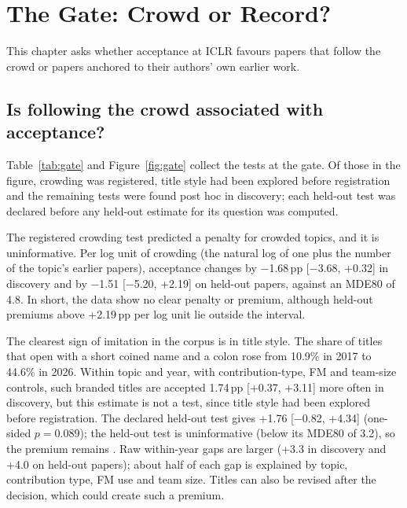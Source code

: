 \chapter{The Gate: Crowd or Record?}
\label{sec:gate}

This chapter asks whether acceptance at ICLR favours papers that follow the crowd or papers anchored to their authors'
own earlier work.

\section{Is following the crowd associated with acceptance?}
Table~\ref{tab:gate} and Figure~\ref{fig:gate} collect the tests at the gate. Of those in the figure, crowding was
registered, title style had been explored before registration and the remaining tests were found post hoc in
discovery; each held-out test was declared before any held-out estimate for its question was computed.

The registered crowding test predicted a penalty for crowded topics, and it is uninformative. Per log unit of crowding
(the natural log of one plus the number of the topic's earlier papers), acceptance changes by $-$1.68\,pp [$-$3.68,
+0.32] in discovery and by $-$1.51 [$-$5.20, +2.19] on held-out papers, against an MDE80 of 4.8. In short, the data show no clear penalty or premium, although held-out premiums above +2.19\,pp per log unit lie outside the interval.

The clearest sign of imitation in the corpus is in title style. The share of titles that open with a short coined
name and a colon rose from 10.9\% in 2017 to 44.6\% in 2026. Within topic and year, with contribution-type, FM and
team-size controls, such branded titles are accepted 1.74\,pp [+0.37, +3.11] more often in discovery, but this estimate
is not a test, since title style had been explored before registration. The declared held-out test gives +1.76
[$-$0.82, +4.34] (one-sided $p = 0.089$); the held-out test is uninformative (below its MDE80 of 3.2), so the premium
remains . Raw within-year gaps are larger (+3.3 in discovery and +4.0 on held-out papers); about half
of each gap is explained by topic, contribution type, FM use and team size. Titles can also be revised after the
decision, which could create such a premium.

